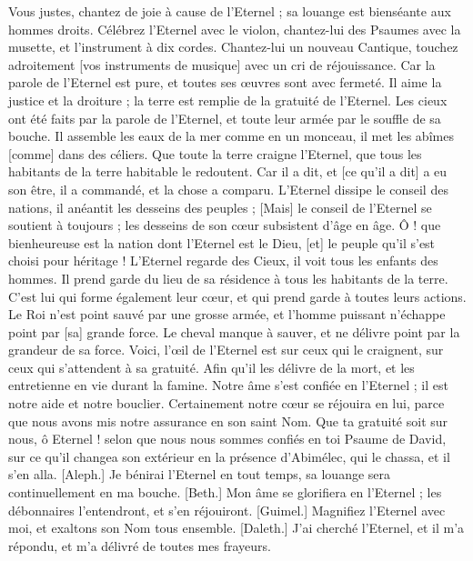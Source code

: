 \begin{multicols}{2}
\VerseOne{}Vous justes, chantez de joie à cause de l'Eternel ; sa louange est bienséante aux hommes droits.
Célébrez l'Eternel avec le violon, chantez-lui des Psaumes avec la musette, et l'instrument à dix cordes.
Chantez-lui un nouveau Cantique, touchez adroitement [vos instruments de musique] avec un cri de réjouissance.
Car la parole de l'Eternel est pure, et toutes ses œuvres sont avec fermeté.
Il aime la justice et la droiture ; la terre est remplie de la gratuité de l'Eternel.
Les cieux ont été faits par la parole de l'Eternel, et toute leur armée par le souffle de sa bouche.
Il assemble les eaux de la mer comme en un monceau, il met les abîmes [comme] dans des céliers.
Que toute la terre craigne l'Eternel, que tous les habitants de la terre habitable le redoutent.
Car il a dit, et [ce qu'il a dit] a eu son être, il a commandé, et la chose a comparu.
L'Eternel dissipe le conseil des nations, il anéantit les desseins des peuples ;
[Mais] le conseil de l'Eternel se soutient à toujours ; les desseins de son cœur subsistent d'âge en âge.
Ô ! que bienheureuse est la nation dont l'Eternel est le Dieu, [et] le peuple qu'il s'est choisi pour héritage !
L'Eternel regarde des Cieux, il voit tous les enfants des hommes.
Il prend garde du lieu de sa résidence à tous les habitants de la terre.
C'est lui qui forme également leur cœur, et qui prend garde à toutes leurs actions.
Le Roi n'est point sauvé par une grosse armée, et l'homme puissant n'échappe point par [sa] grande force.
Le cheval manque à sauver, et ne délivre point par la grandeur de sa force.
Voici, l'œil de l'Eternel est sur ceux qui le craignent, sur ceux qui s'attendent à sa gratuité.
Afin qu'il les délivre de la mort, et les entretienne en vie durant la famine.
Notre âme s'est confiée en l'Eternel ; il est notre aide et notre bouclier.
Certainement notre cœur se réjouira en lui, parce que nous avons mis notre assurance en son saint Nom.
Que ta gratuité soit sur nous, ô Eternel ! selon que nous nous sommes confiés en toi
\VerseOne{}Psaume de David, sur ce qu'il changea son extérieur en la présence d'Abimélec, qui le chassa, et il s'en alla. [Aleph.] Je bénirai l'Eternel en tout temps, sa louange sera continuellement en ma bouche.
[Beth.] Mon âme se glorifiera en l'Eternel ; les débonnaires l'entendront, et s'en réjouiront.
[Guimel.] Magnifiez l'Eternel avec moi, et exaltons son Nom tous ensemble.
[Daleth.] J'ai cherché l'Eternel, et il m'a répondu, et m'a délivré de toutes mes frayeurs.

\end{multicols}
